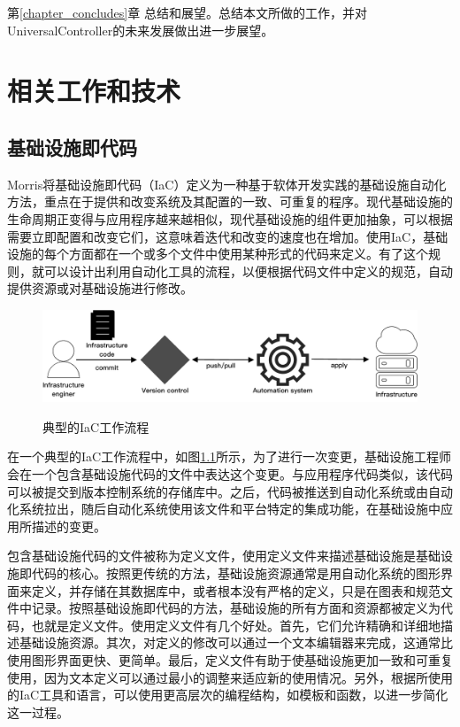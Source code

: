 \documentclass[macfonts,master]{njuthesis}
\begin{document}
第\ref{chapter_concludes}章 总结和展望。总结本文所做的工作，并对UniversalController的未来发展做出进一步展望。
\chapter{相关工作和技术}\label{chapter_relative}

\section{基础设施即代码}

Morris将基础设施即代码（IaC）定义为一种基于软体开发实践的基础设施自动化方法，重点在于提供和改变系统及其配置的一致、可重复的程序\cite{morris2016infrastructure}。现代基础设施的生命周期正变得与应用程序越来越相似，现代基础设施的组件更加抽象，可以根据需要立即配置和改变它们，这意味着迭代和改变的速度也在增加。使用IaC，基础设施的每个方面都在一个或多个文件中使用某种形式的代码来定义。有了这个规则，就可以设计出利用自动化工具的流程，以便根据代码文件中定义的规范，自动提供资源或对基础设施进行修改。

\begin{figure}[htbp]
  \centering
  \includegraphics[width= 1\textwidth]{pics/IaC.pdf}\\
  \caption{典型的IaC工作流程}\label{fig:IaC}
\end{figure}

在一个典型的IaC工作流程中，如图\ref{fig:IaC}所示，为了进行一次变更，基础设施工程师会在一个包含基础设施代码的文件中表达这个变更。与应用程序代码类似，该代码可以被提交到版本控制系统的存储库中。之后，代码被推送到自动化系统或由自动化系统拉出，随后自动化系统使用该文件和平台特定的集成功能，在基础设施中应用所描述的变更\cite{whatisiac}。

包含基础设施代码的文件被称为定义文件，使用定义文件来描述基础设施是基础设施即代码的核心。按照更传统的方法，基础设施资源通常是用自动化系统的图形界面来定义，并存储在其数据库中，或者根本没有严格的定义，只是在图表和规范文件中记录。按照基础设施即代码的方法，基础设施的所有方面和资源都被定义为代码，也就是定义文件\cite{morris2016infrastructure}。使用定义文件有几个好处。首先，它们允许精确和详细地描述基础设施资源。其次，对定义的修改可以通过一个文本编辑器来完成，这通常比使用图形界面更快、更简单。最后，定义文件有助于使基础设施更加一致和可重复使用，因为文本定义可以通过最小的调整来适应新的使用情况。另外，根据所使用的IaC工具和语言，可以使用更高层次的编程结构，如模板和函数，以进一步简化这一过程\cite{morris2016infrastructure}\cite{whatisiac}。
\end{document}
